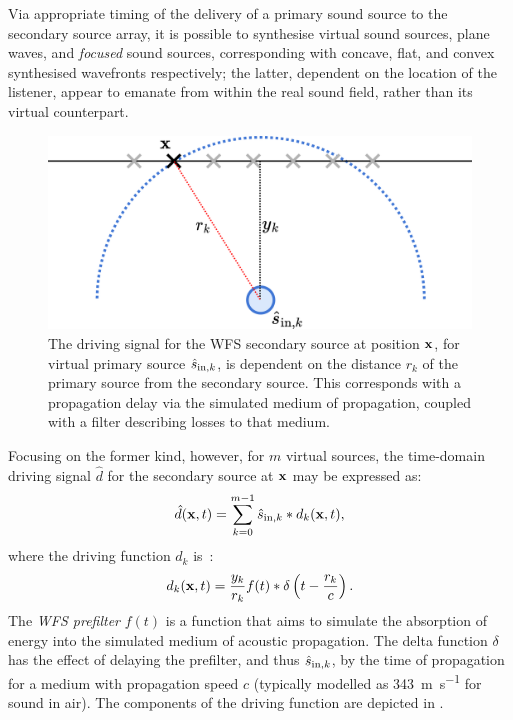 Via appropriate timing of the delivery of a primary sound source to the
secondary source array, it is possible to synthesise virtual sound sources,
plane waves, and \textit{focused} sound sources, corresponding with concave,
flat, and convex synthesised wavefronts respectively; the latter, dependent
on the location of the listener, appear to emanate from within the real
sound field, rather than its virtual counterpart.

\begin{figure}[ht]
    \centering
    \includegraphics[width=.75\textwidth]{figures/wfs_2}
    \caption{
        The driving signal for the WFS secondary source at position $\mathbf{x}$,
        for virtual primary source $\hat{s}_{\text{in},k}$, is dependent on the distance
        $r_k$ of the primary source from the secondary source.
        This corresponds with a propagation delay via the simulated medium of
        propagation, coupled with a filter describing losses to that medium.
    }
    \label{fig:wfs_2}
\end{figure}

Focusing on the former kind, however, for $m$ virtual sources, the time-domain
driving signal $\hat{d}$ for the secondary source at $\mathbf{x}$ may be expressed
as:
\begin{equation}
    \label{eq:driving-signal}
    \hat{d}(\mathbf{x},t) = \sum_{k=0}^{m-1}\hat{s}_{\text{in},k} \ast d_k(\mathbf{x},t),
\end{equation}
where the driving function $d_k$ is~\citep{ahrens_analytic_2012}:
\begin{equation}
    \label{eq:driving-function}
    d_k(\mathbf{x},t) = \frac{y_k}{r_k}f(t) \ast \delta\left(t - \frac{r_k}{c}\right).
\end{equation}
The \textit{WFS prefilter} $f(t)$ is a function that aims to simulate the
absorption of energy into the simulated medium of acoustic propagation.
The delta function $\delta$ has the effect of delaying the prefilter, and thus
$\hat{s}_{\text{in},k}$, by the time of propagation for a medium with propagation speed $c$
(typically modelled as \qty[per-mode=symbol]{343}{\m\per\s} for sound in air).
The components of the driving function are depicted in .

